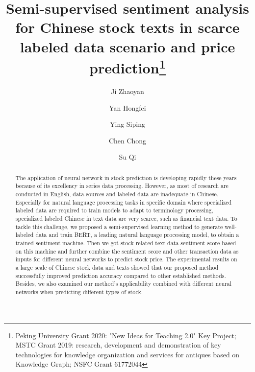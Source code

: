 \documentclass[runningheads]{llncs}
\begin{document}
%
\title{Semi-supervised sentiment analysis for Chinese stock texts in scarce labeled data scenario and price prediction\thanks{Peking University Grant 2020: "New Ideas for Teaching 2.0" Key Project; MSTC
Grant 2019: research, development and demonstration of key technologies for knowledge organization and services for antiques based on Knowledge Graph; NSFC Grant 61772044}}
%
%
\author{Ji Zhaoyan \and
Yan Hongfei \and
Ying Siping\orcidID{[0000--0001--5829--1865} \and
Chen Chong \and 
Su Qi}
%
%
%
\maketitle              %
%
\begin{abstract}
The application of neural network in stock prediction is developing rapidly these years because of its excellency in series data processing. However, as most of research are conducted in English, data sources and labeled data are inadequate in Chinese. Especially for natural language processing tasks in specific domain where specialized labeled data are required to train models to adapt to terminology processing, specialized labeled Chinese in text data are very scarce, such as financial text data. To tackle this challenge, we proposed a semi-supervised learning method to generate well-labeled data and train BERT, a leading natural language processing model, to obtain a trained sentiment machine. Then we got stock-related text data sentiment score based on this machine and further combine the sentiment score and other transaction data as inputs for different neural networks to predict stock price. The experimental results on a large scale of Chinese stock data and texts showed that our proposed method successfully improved prediction accuracy compared to other established methods. Besides, we also examined our method's applicability combined with different neural networks when predicting different types of stock.
\end{abstract}
%
%
%
\end{document}
